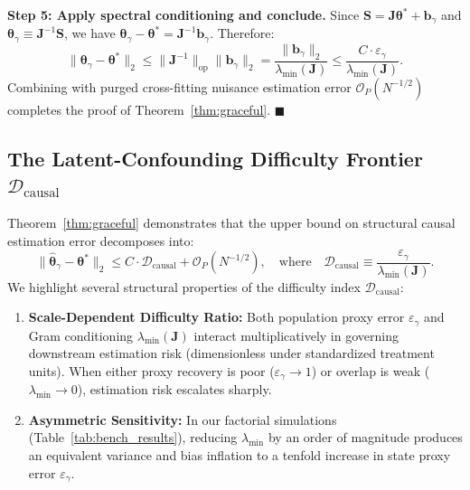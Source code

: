\documentclass[twoside]{article}
\theoremstyle{definition}
\begin{document}
\textbf{Step 5: Apply spectral conditioning and conclude.}
Since $\boldsymbol{S} = \boldsymbol{J}\boldsymbol{\theta}^* + \boldsymbol{b}_\gamma$ and $\boldsymbol{\theta}_\gamma \equiv \boldsymbol{J}^{-1}\boldsymbol{S}$, we have $\boldsymbol{\theta}_\gamma - \boldsymbol{\theta}^* = \boldsymbol{J}^{-1}\boldsymbol{b}_\gamma$. Therefore:
\begin{equation}
    \|\boldsymbol{\theta}_\gamma - \boldsymbol{\theta}^*\|_2 \le \|\boldsymbol{J}^{-1}\|_{\mathrm{op}} \|\boldsymbol{b}_\gamma\|_2 = \frac{\|\boldsymbol{b}_\gamma\|_2}{\lambda_{\min}(\boldsymbol{J})} \le \frac{C \cdot \varepsilon_\gamma}{\lambda_{\min}(\boldsymbol{J})}.
\end{equation}
Combining with purged cross-fitting nuisance estimation error $\mathcal{O}_P(N^{-1/2})$ completes the proof of Theorem~\ref{thm:graceful}. $\blacksquare$

\subsection{The Latent-Confounding Difficulty Frontier $\mathcal{D}_{\mathrm{causal}}$}
\label{app:difficulty_frontier}
Theorem~\ref{thm:graceful} demonstrates that the upper bound on structural causal estimation error decomposes into:
\begin{equation}
    \|\hat{\boldsymbol{\theta}}_\gamma - \boldsymbol{\theta}^*\|_2 \le C \cdot \mathcal{D}_{\mathrm{causal}} + \mathcal{O}_P(N^{-1/2}), \quad \text{where} \quad \mathcal{D}_{\mathrm{causal}} \equiv \frac{\varepsilon_\gamma}{\lambda_{\min}(\boldsymbol{J})}.
\end{equation}
We highlight several structural properties of the difficulty index $\mathcal{D}_{\mathrm{causal}}$:
\begin{enumerate}
    \item \textbf{Scale-Dependent Difficulty Ratio:} Both population proxy error $\varepsilon_\gamma$ and Gram conditioning $\lambda_{\min}(\boldsymbol{J})$ interact multiplicatively in governing downstream estimation risk (dimensionless under standardized treatment units). When either proxy recovery is poor ($\varepsilon_\gamma \to 1$) or overlap is weak ($\lambda_{\min} \to 0$), estimation risk escalates sharply.
    \item \textbf{Asymmetric Sensitivity:} In our factorial simulations (Table~\ref{tab:bench_results}), reducing $\lambda_{\min}$ by an order of magnitude produces an equivalent variance and bias inflation to a tenfold increase in state proxy error $\varepsilon_\gamma$.
\end{enumerate}
\end{document}

